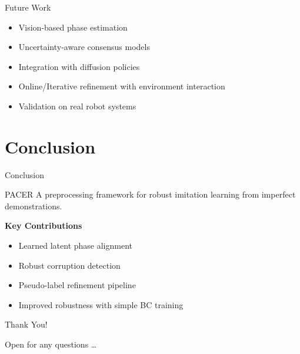 \documentclass{beamer}
\begin{document}
\begin{frame}{Future Work}

    \begin{itemize}
        \item Vision-based phase estimation
        \item Uncertainty-aware consensus models
        \item Integration with diffusion policies
        \item Online/Iterative refinement with environment interaction
        \item Validation on real robot systems
    \end{itemize}

\end{frame}

\section{Conclusion}

\begin{frame}{Conclusion}

    \begin{block}{PACER}
        A preprocessing framework for robust imitation learning from imperfect demonstrations.
    \end{block}

    \vspace{1em}

    \textbf{Key Contributions}

    \begin{itemize}
        \item Learned latent phase alignment
        \item Robust corruption detection
        \item Pseudo-label refinement pipeline
        \item Improved robustness with simple BC training
    \end{itemize}

\end{frame}

\begin{frame}

    \centering

    \vspace{2em}

    {\Huge Thank You!}

    \vspace{2em}

    {\large Open for any questions \ldots}

\end{frame}
\end{document}
